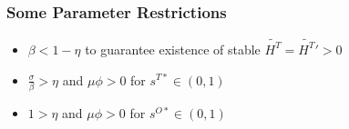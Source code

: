 \documentclass[11pt]{beamer}
\begin{document}
		
		\begin{frame}
			\frametitle{Some Parameter Restrictions}
			\label{param}
			\begin{itemize}
				\item $\beta < 1-\eta$ to guarantee existence of stable $\widetilde{H^T} = \widetilde{H^T}' > 0$
				\item $\tfrac{\sigma}{\beta} > \eta$ and $\mu \phi > 0$ for $s^{T*} \in (0,1)$
				\item $1 > \eta$ and $\mu \phi > 0$ for $s^{O*} \in (0,1)$
			\end{itemize}
			\hyperlink{eqm}{}
		\end{frame}
		
\end{document}
